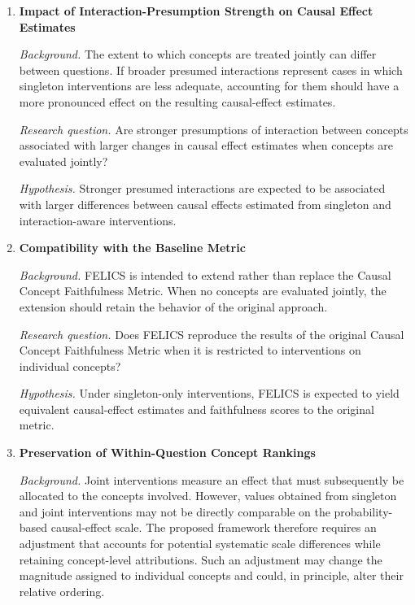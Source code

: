 \begin{enumerate}[
		label=\textbf{Q\arabic*},
		ref=Q\arabic*,
		wide=0pt,
		leftmargin=0pt
	]

	\item \label{rq:correlation_diff}
	      \textbf{Impact of Interaction-Presumption Strength on Causal Effect Estimates}

	      \noindent\textit{Background.}
	      The extent to which concepts are treated jointly can differ between
	      questions. If broader presumed interactions represent cases in which
	      singleton interventions are less adequate, accounting for them should have
	      a more pronounced effect on the resulting causal-effect estimates.

	      \noindent\textit{Research question.}
	      Are stronger presumptions of interaction between concepts associated with
	      larger changes in causal effect estimates when concepts are evaluated
	      jointly?

	      \noindent\textit{Hypothesis.}
	      Stronger presumed interactions are expected to be associated with larger
	      differences between causal effects estimated from singleton and
	      interaction-aware interventions.

	\item \label{rq:convergence}
	      \textbf{Compatibility with the Baseline Metric}

	      \noindent\textit{Background.}
	      FELICS is intended to extend rather than replace the Causal Concept
	      Faithfulness Metric. When no concepts are evaluated jointly, the extension
	      should retain the behavior of the original approach.

	      \noindent\textit{Research question.}
	      Does FELICS reproduce the results of the original Causal Concept
	      Faithfulness Metric when it is restricted to interventions on individual
	      concepts?

	      \noindent\textit{Hypothesis.}
	      Under singleton-only interventions, FELICS is expected to yield equivalent
	      causal-effect estimates and faithfulness scores to the original metric.

	\item \label{rq:ranking}
	      \textbf{Preservation of Within-Question Concept Rankings}

	      \noindent\textit{Background.}
	      Joint interventions measure an effect that must subsequently be allocated
	      to the concepts involved. However, values obtained from singleton and joint
	      interventions may not be directly comparable on the probability-based
	      causal-effect scale. The proposed framework therefore requires an
	      adjustment that accounts for potential systematic scale differences while
	      retaining concept-level attributions. Such an adjustment may change the
	      magnitude assigned to individual concepts and could, in principle, alter
	      their relative ordering.


\end{enumerate}
